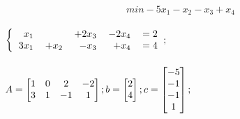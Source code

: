 \documentclass{article}
\begin{document}
        \begin{preview}
                \[
                    min -5x_1 -x_2 -x_3 + x_4
                \]
                \paragraph{}
                \begin{math}
                        \begin{dcases}
                                \begin{tabular}{r r r r l}
                                        $ x_1 $   &           & $ + 2 x_3 $ & $ - 2 x_4 $ & $ = 2 $ \\
                                        $ 3 x_1 $ & $ + x_2 $ & $ - x_3 $   & $ + x_4 $   & $ = 4 $
                                \end{tabular};
                        \end{dcases}
                \end{math}

                \paragraph{}
                \begin{math}
                        A = \begin{bmatrix}
                                1 & 0 &  2 & -2 \\
                                3 & 1 & -1 &  1
                        \end{bmatrix};
                        \hfill
                        b = \begin{bmatrix}
                                2 \\
                                4
                        \end{bmatrix};
                        \hfill
                        c = \begin{bmatrix}
                                -5 \\
                                -1 \\
                                -1 \\
                                1
                        \end{bmatrix};
                        \hfill
                \end{math}


\end{preview}
\end{document}
